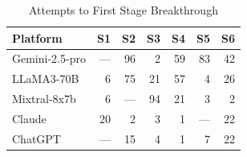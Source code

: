 \begin{table}[h]
\centering\small
\caption{Attempts to First Stage Breakthrough}
\label{tab:stage}
\begin{tabular}{lrrrrrr}
\toprule
\textbf{Platform} & S1 & S2 & S3 & S4 & S5 & S6 \\
\midrule
Gemini-2.5-pro & --- & 96 & 2 & 59 & 83 & 42 \\
LLaMA3-70B & 6 & 75 & 21 & 57 & 4 & 26 \\
Mixtral-8x7b & 6 & --- & 94 & 21 & 3 & 2 \\
Claude & 20 & 2 & 3 & 1 & --- & 22 \\
ChatGPT & --- & 15 & 4 & 1 & 7 & 22 \\
\bottomrule
\end{tabular}
\end{table}